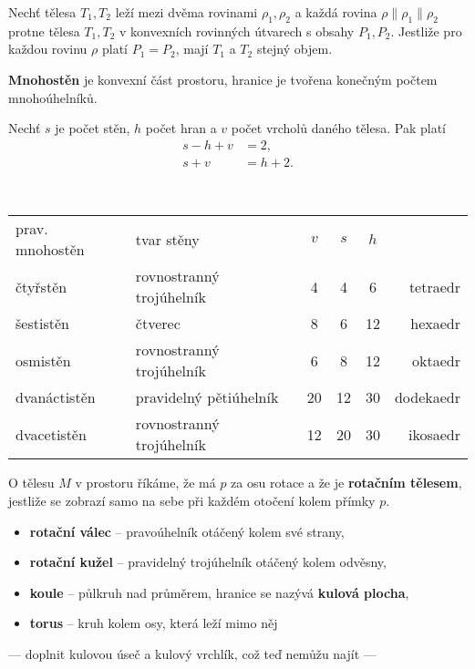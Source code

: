 \begin{veta}
    Nechť tělesa $T_1, T_2$ leží mezi dvěma rovinami $\rho_1, \rho_2$ a každá rovina
    $\rho \parallel \rho_1\parallel \rho_2$ protne tělesa $T_1, T_2$ v konvexních
    rovinných útvarech s obsahy $P_1, P_2.$ Jestliže pro každou rovinu $\rho$ platí
    $P_1=P_2$, mají $T_1$ a $T_2$ stejný objem.
\end{veta}

\begin{definition}
\textbf{Mnohostěn} je konvexní část prostoru, hranice je tvořena konečným počtem
mnohoúhelníků.
\end{definition}

\begin{veta}
    Nechť $s$ je počet stěn, $h$ počet hran a $v$ počet vrcholů daného tělesa. Pak
    platí
    \begin{align*}
        s-h+v &=2,\\
        s+v &=h+2.
    \end{align*}
\end{veta}

\begin{pozn}\,
\begin{center}
\begin{tabular}{l|l|c|c|c|r}
    prav. mnohostěn & tvar stěny & $v$ & $s$ & $h$ & \, \\
    čtyřstěn        & rovnostranný trojúhelník & 4 & 4&6 & tetraedr \\
    šestistěn       & čtverec & 8 & 6&12 & hexaedr \\
    osmistěn        & rovnostranný trojúhelník & 6 & 8&12 & oktaedr \\
    dvanáctistěn    & pravidelný pětiúhelník & 20 & 12&30 & dodekaedr \\
    dvacetistěn     & rovnostranný trojúhelník & 12 & 20&30 & ikosaedr \\
\end{tabular}
\end{center}

\end{pozn}

\begin{definition}
    O tělesu $M$ v prostoru říkáme, že má $p$ za osu rotace a že je \textbf{rotačním
    tělesem}, jestliže se zobrazí samo na sebe při každém otočení kolem přímky $p.$
\end{definition}

\begin{pozn}
\begin{itemize}
\item \textbf{rotační válec} -- pravoúhelník otáčený kolem své strany,
\item \textbf{rotační kužel} -- pravidelný trojúhelník otáčený kolem odvěsny,
\item \textbf{koule} -- půlkruh nad průměrem, hranice se nazývá \textbf{kulová plocha},
\item \textbf{torus} -- kruh kolem osy, která leží mimo něj
\end{itemize}
\end{pozn}

--- doplnit kulovou úseč a kulový vrchlík, což teď nemůžu najít ---
